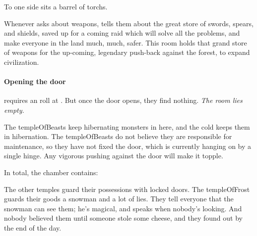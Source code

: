 \begin{multicols}{2}
To one side sits a barrel of \glspl{torch}.


\begin{exampletext}
  Whenever  asks about \glspl{weapon},  tells them about the great store of swords, spears, and shields, saved up for a coming raid which will solve all the problems, and make everyone in the land much, much, safer.
  This room holds that grand store of weapons for the up-coming, legendary push-back against the forest, to expand civilization.
\end{exampletext}

\paragraph{Opening the door}
requires an  roll at \tn[12].
But once the door opens, they find nothing.
\emph{The room lies empty.}


The \gls{templeOfBeasts} keep hibernating \glspl{monster} in here, and the cold keeps them in hibernation.
The \gls{templeOfBeasts} do not believe they are responsible for maintenance, so they have not fixed the door, which is currently hanging on by a single hinge.
Any vigorous pushing against the door will make it topple.

In total, the chamber contains:

\chitincrawler

\chitincrawler



\basilisk

\dragon

\showStdSpells



\begin{exampletext}
  The other \glspl{temple} guard their possessions with locked doors.
  The \gls{templeOfFrost} guards their goods a snowman and a lot of lies.
  They tell everyone that the snowman can see them; he's magical, and speaks when nobody's looking.
  And nobody believed them until someone stole some cheese, and they found out by the end of the day.


\end{exampletext}
\end{multicols}
